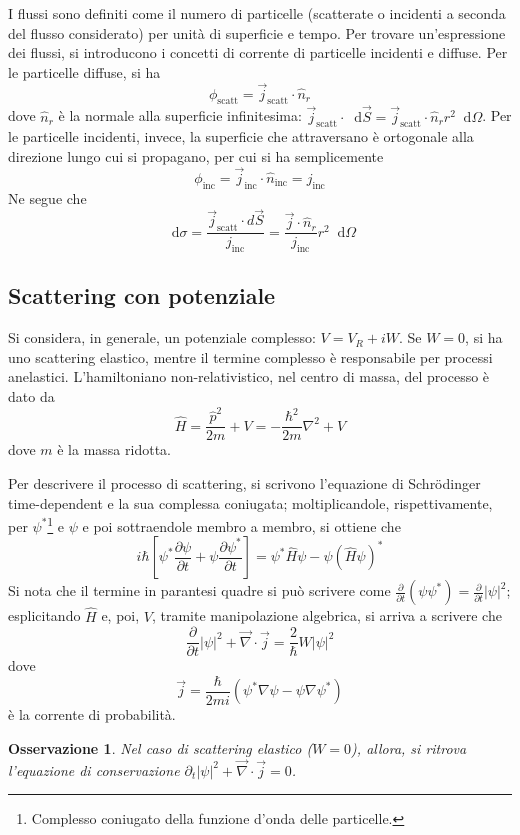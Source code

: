 \documentclass[11pt, a4paper]{scrartcl}
\theoremstyle{style}
\newtheorem{osservazione}{Osservazione}[section]
\newcommand{\dd}{\mathop{}\!\mathrm{d}}
\numberwithin{equation}{subsection}
\begin{document}
I flussi sono definiti come il numero di particelle (scatterate o incidenti a seconda del flusso considerato) per unit\`a di superficie e tempo.
Per trovare un'espressione dei flussi, si introducono i concetti di corrente di particelle incidenti e diffuse.
Per le particelle diffuse, si ha
\[
\phi _\text{scatt} = \vec{j}_\text{scatt} \cdot \hat{n}_r
\] 
dove $\hat{n}_r$ \`e la normale alla superficie infinitesima: $\vec{j}_\text{scatt} \cdot  \dd \vec{S} = \vec{j}_\text{scatt} \cdot \hat{n}_r r^2 \dd \Omega $.
Per le particelle incidenti, invece, la superficie che attraversano \`e ortogonale alla direzione lungo cui si propagano, per cui si ha semplicemente 
\[
\phi _\text{inc} = \vec{j}_\text{inc} \cdot \hat{n}_{\text{inc}} =j_\text{inc}
\] 
Ne segue che
\begin{equation}
\dd \sigma  = \frac{\vec{j}_\text{scatt} \cdot d\vec{S}}{j_\text{inc}} = \frac{\vec{j}\cdot \hat{n}_r}{j_\text{inc}} r^2 \dd \Omega 
\end{equation}

\subsection{Scattering con potenziale}\label{scn}

Si considera, in generale, un potenziale complesso: $V = V_R + i W$.
Se $W=0$, si ha uno scattering elastico, mentre il termine complesso \`e responsabile per processi anelastici.
L'hamiltoniano non-relativistico, nel centro di massa, del processo \`e dato da 
\[
\hat{H} = \frac{\hat{p}^2}{2m} + V = -\frac{\hbar^2}{2m} \nabla ^2 + V
\] 
dove $m$ \`e la massa ridotta.

Per descrivere il processo di scattering, si scrivono l'equazione di Schr\"odinger time-dependent e la sua complessa coniugata; moltiplicandole, rispettivamente, per $\psi ^*$\footnote{Complesso coniugato della funzione d'onda delle particelle.} e $\psi $ e poi sottraendole membro a membro, si ottiene che
\[
i\hbar  \left[ \psi ^* \frac{\partial \psi }{\partial t} + \psi \frac{\partial \psi ^*}{\partial t}  \right]  = \psi ^* \hat{H}\psi  - \psi (\hat{H}\psi )^* 
\] 
Si nota che il termine in parantesi quadre si pu\`o scrivere come $\frac{\partial }{\partial t}  (\psi \psi ^*) = \frac{\partial }{\partial t} \lvert \psi  \rvert ^2$; esplicitando $\hat{H}$ e, poi, $V$, tramite manipolazione algebrica, si arriva a scrivere che
\begin{equation}
	\frac{\partial }{\partial t} \lvert \psi  \rvert ^2 + \vec{\nabla }\cdot \vec{j}=\frac{2}{\hbar } W \lvert \psi  \rvert ^2
\end{equation}
dove 
\[
\vec{j} = \frac{\hbar }{2mi} \left(\psi ^* \nabla \psi  - \psi  \nabla \psi ^*\right) 
\] 
\`e la corrente di probabilit\`a.
\begin{osservazione}
Nel caso di scattering elastico ($W=0$), allora, si ritrova l'equazione di conservazione $\partial _t \lvert \psi  \rvert ^2 + \vec{\nabla }\cdot \vec{j} = 0$.
\end{osservazione}
\end{document}
